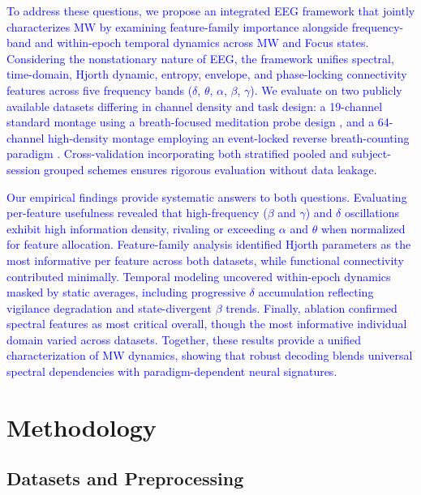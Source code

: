 \documentclass[conference]{IEEEtran}
\begin{document}
\textcolor{blue}{To address these questions, we propose an integrated EEG framework that jointly characterizes MW by examining feature-family importance alongside frequency-band and within-epoch temporal dynamics across MW and Focus states. Considering the nonstationary nature of EEG, the framework unifies spectral, time-domain, Hjorth dynamic, entropy, envelope, and phase-locking connectivity features across five frequency bands ($\delta$, $\theta$, $\alpha$, $\beta$, $\gamma$). We evaluate on two publicly available datasets differing in channel density and task design: a 19-channel standard montage using a breath-focused meditation probe design \cite{rodlarios}, and a 64-channel high-density montage employing an event-locked reverse breath-counting paradigm \cite{grandchamp2014oculometric}. Cross-validation incorporating both stratified pooled and subject-session grouped schemes ensures rigorous evaluation without data leakage.}

\textcolor{blue}{Our empirical findings provide systematic answers to both questions. Evaluating per-feature usefulness revealed that high-frequency ($\beta$ and $\gamma$) and $\delta$ oscillations exhibit high information density, rivaling or exceeding $\alpha$ and $\theta$ when normalized for feature allocation. Feature-family analysis identified Hjorth parameters as the most informative per feature across both datasets, while functional connectivity contributed minimally. Temporal modeling uncovered within-epoch dynamics masked by static averages, including progressive $\delta$ accumulation reflecting vigilance degradation and state-divergent $\beta$ trends. Finally, ablation confirmed spectral features as most critical overall, though the most informative individual domain varied across datasets. Together, these results provide a unified characterization of MW dynamics, showing that robust decoding blends universal spectral dependencies with paradigm-dependent neural signatures.}

\section{Methodology}

\subsection{Datasets and Preprocessing}
\end{document}
